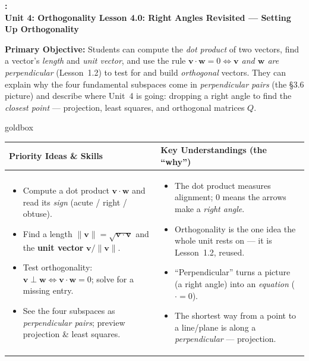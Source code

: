 \documentclass[10pt]{article}
\newcommand{\vv}{\mathbf{v}}
\newcommand{\ww}{\mathbf{w}}
\newcommand{\UnitNumberName}{Unit 4: Orthogonality \quad}
\newcommand{\LessonNumberName}{Lesson 4.0: Right Angles Revisited --- Setting Up Orthogonality}
\begin{document}
\begin{center}
    {\Large\bfseries \CourseName: \SchoolYear \\
    {\small\bfseries \UnitNumberName \LessonNumberName}}
\end{center}

\begin{tcolorbox}[colback=blush, colframe=burgundy, boxrule=0.9pt, arc=2mm,
    left=2mm, right=2mm, top=1.5mm, bottom=1.5mm]
    \textbf{Primary Objective:} Students can compute the \emph{dot product} of two vectors, find a
    vector's \emph{length} and \emph{unit vector}, and use the rule
    \emph{$\vv\cdot\ww=0 \Leftrightarrow \vv$ and $\ww$ are perpendicular} (Lesson~1.2) to test
    for and build \emph{orthogonal} vectors. They can explain why the four fundamental subspaces
    come in \emph{perpendicular pairs} (the §3.6 picture) and describe where Unit~4 is going:
    dropping a right angle to find the \emph{closest point} --- projection, least squares, and
    orthogonal matrices $Q$.
\end{tcolorbox}

\renewcommand{\arraystretch}{1.4}
\begin{skillbox}{goldbox}
\begin{tabularx}{\linewidth}{@{}X|X@{}}
\textbf{Priority Ideas \& Skills} & \textbf{Key Understandings (the ``why'')} \\[2pt]
\hline
\vspace{-6pt}
\begin{itemize}[leftmargin=1.1em, nosep, after=\vspace{2pt}]
  \item Compute a dot product $\vv\cdot\ww$ and read its \emph{sign} (acute / right / obtuse).
  \item Find a length $\|\vv\|=\sqrt{\vv\cdot\vv}$ and the \textbf{unit vector} $\vv/\|\vv\|$.
  \item Test orthogonality: $\vv\perp\ww \Leftrightarrow \vv\cdot\ww=0$; solve for a missing entry.
  \item See the four subspaces as \emph{perpendicular pairs}; preview projection \& least squares.
\end{itemize}
&
\vspace{-6pt}
\begin{itemize}[leftmargin=1.1em, nosep, after=\vspace{2pt}]
  \item The dot product measures alignment; $0$ means the arrows make a \emph{right angle}.
  \item Orthogonality is the one idea the whole unit rests on --- it is Lesson~1.2, reused.
  \item ``Perpendicular'' turns a picture (a right angle) into an \emph{equation} ($\cdot=0$).
  \item The shortest way from a point to a line/plane is along a \emph{perpendicular} --- projection.
\end{itemize}
\end{tabularx}
\end{skillbox}
\end{document}
